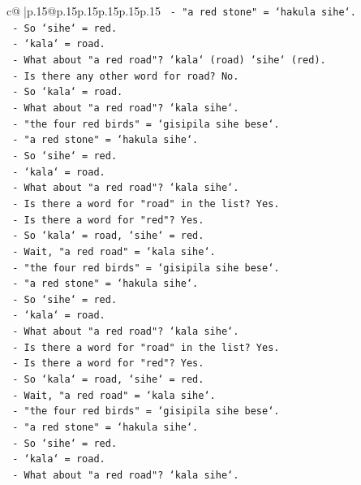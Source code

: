 \documentclass{article}
\begin{document}
{\begin{supertabular}{c@{$\;$}|p{.15\linewidth}@{}p{.15\linewidth}p{.15\linewidth}p{.15\linewidth}p{.15\linewidth}p{.15\linewidth}}
{{{\texttt{  {-} "a red stone" = `hakula sihe`.} \\
\texttt{  {-} So `sihe` = red.} \\
\texttt{  {-} `kala` = road.} \\
\texttt{  {-} What about "a red road"? `kala` (road) `sihe` (red).} \\
\texttt{  {-} Is there any other word for road? No.} \\
\texttt{  {-} So `kala` = road.} \\
\texttt{  {-} What about "a red road"? `kala sihe`.} \\
\texttt{  {-} "the four red birds" = `gisipila sihe bese`.} \\
\texttt{  {-} "a red stone" = `hakula sihe`.} \\
\texttt{  {-} So `sihe` = red.} \\
\texttt{  {-} `kala` = road.} \\
\texttt{  {-} What about "a red road"? `kala sihe`.} \\
\texttt{  {-} Is there a word for "road" in the list? Yes.} \\
\texttt{  {-} Is there a word for "red"? Yes.} \\
\texttt{  {-} So `kala` = road, `sihe` = red.} \\
\texttt{  {-} Wait, "a red road" = `kala sihe`.} \\
\texttt{  {-} "the four red birds" = `gisipila sihe bese`.} \\
\texttt{  {-} "a red stone" = `hakula sihe`.} \\
\texttt{  {-} So `sihe` = red.} \\
\texttt{  {-} `kala` = road.} \\
\texttt{  {-} What about "a red road"? `kala sihe`.} \\
\texttt{  {-} Is there a word for "road" in the list? Yes.} \\
\texttt{  {-} Is there a word for "red"? Yes.} \\
\texttt{  {-} So `kala` = road, `sihe` = red.} \\
\texttt{  {-} Wait, "a red road" = `kala sihe`.} \\
\texttt{  {-} "the four red birds" = `gisipila sihe bese`.} \\
\texttt{  {-} "a red stone" = `hakula sihe`.} \\
\texttt{  {-} So `sihe` = red.} \\
\texttt{  {-} `kala` = road.} \\
\texttt{  {-} What about "a red road"? `kala sihe`.} \\
}}}
\end{supertabular}}
\end{document}
